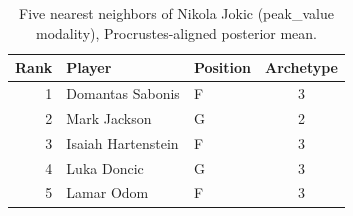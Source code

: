 \begin{table}[htbp]
  \centering\small
  \begin{tabular}{rllc}
    \toprule
    Rank & Player & Position & Archetype \\
    \midrule
    1 & Domantas Sabonis & F & 3 \\
    2 & Mark Jackson & G & 2 \\
    3 & Isaiah Hartenstein & F & 3 \\
    4 & Luka Doncic & G & 3 \\
    5 & Lamar Odom & F & 3 \\
    \bottomrule
  \end{tabular}
  \caption{Five nearest neighbors of Nikola Jokic (peak_value modality), Procrustes-aligned posterior mean.}
  \label{tab:Nikola_Jokic_neighbors_peak_value}
\end{table}

